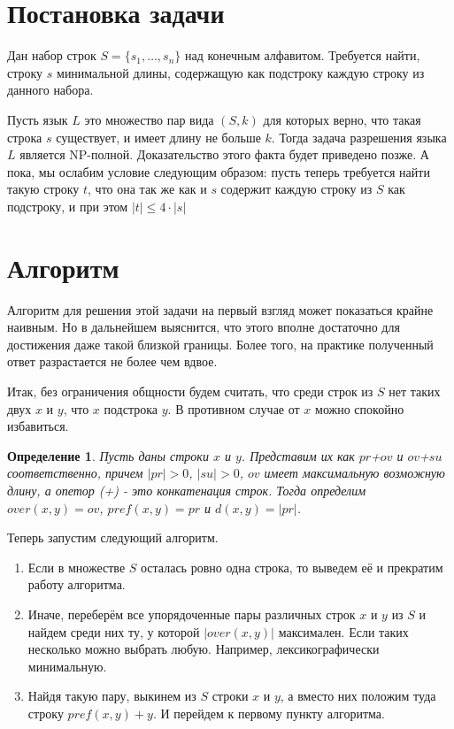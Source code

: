 \documentclass[a4paper,10pt]{article}
\title{\B{Общая надстрока наименьшей длины}}
\author{Андрей Осипов}
\newtheorem{definition}{Определение}
\begin{document}
\Russian
\maketitle

\section{Постановка задачи}
Дан набор строк $S = \{s_1,\dots,s_n\}$ над конечным алфавитом. 
Требуется найти, строку $s$ минимальной длины, содержащую как подстроку каждую строку из данного набора.

Пусть язык $L$ это множество пар вида $(S, k)$ для которых верно, что такая строка $s$ существует, и имеет длину не больше $k$.
Тогда задача разрешения языка $L$ является NP-полной.
Доказательство этого факта будет приведено позже.
А пока, мы ослабим условие следующим образом: пусть теперь требуется найти такую строку $t$, 
что она так же как и $s$ содержит каждую строку из $S$ как подстроку, и при этом $|t| \leq 4 \cdot |s|$

\section{Алгоритм}
Алгоритм для решения этой задачи на первый взгляд может показаться крайне наивным.
Но в дальнейшем выяснится, что этого вполне достаточно для достижения даже такой близкой границы.
Более того, на практике полученный ответ разрастается не более чем вдвое.

Итак, без ограничения общности будем считать, что среди строк из $S$ нет таких двух $x$ и $y$, что $x$ подстрока $y$.
В противном случае от $x$ можно спокойно избавиться.

\begin{definition}
Пусть даны строки $x$ и $y$.
Представим их как $pr$+$ov$ и $ov$+$su$ соответственно, причем $|pr|>0$, $|su|>0$, $ov$ имеет максимальную возможную длину, а опетор (+) - это конкатенация строк.
Тогда определим $over(x, y) = ov$, $pref(x, y) = pr$ и $d(x, y) = |pr|$.
\end{definition}

\noindent Теперь запустим следующий алгоритм.
\begin{enumerate}
\item Если в множестве $S$ осталась ровно одна строка, то выведем её и прекратим работу алгоритма.
\item Иначе, переберём все упорядоченные пары различных строк $x$ и $y$ из $S$ и найдем среди них ту, у которой $|over(x, y)|$ максимален.
Если таких несколько можно выбрать любую. Например, лексикографически минимальную.
\item Найдя такую пару, выкинем из $S$ строки $x$ и $y$, а вместо них положим туда строку $pref(x, y)+y$. 
И перейдем к первому пункту алгоритма.
\end{enumerate}
\end{document}
